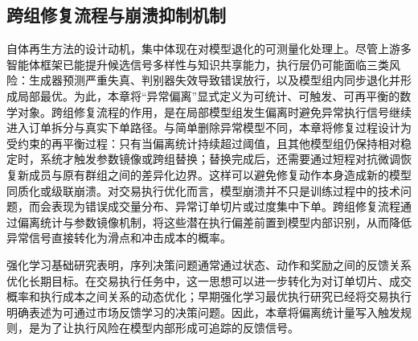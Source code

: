 \subsection{跨组修复流程与崩溃抑制机制}

自体再生方法的设计动机，集中体现在对模型退化的可测量化处理上。尽管上游多智能体框架已能提升候选信号多样性与知识共享能力，执行层仍可能面临三类风险：生成器预测严重失真、判别器失效导致错误放行，以及模型组内同步退化并形成局部最优。为此，本章将“异常偏离”显式定义为可统计、可触发、可再平衡的数学对象。跨组修复流程的作用，是在局部模型组发生偏离时避免异常执行信号继续进入订单拆分与真实下单路径。与简单删除异常模型不同，本章将修复过程设计为受约束的再平衡过程：只有当偏离统计持续超过阈值，且其他模型组仍保持相对稳定时，系统才触发参数镜像或跨组替换；替换完成后，还需要通过短程对抗微调恢复新成员与原有群组之间的差异化边界。这样可以避免修复动作本身造成新的模型同质化或级联崩溃。对交易执行优化而言，模型崩溃并不只是训练过程中的技术问题，而会表现为错误成交量分布、异常订单切片或过度集中下单。跨组修复流程通过偏离统计与参数镜像机制，将这些潜在执行偏差前置到模型内部识别，从而降低异常信号直接转化为滑点和冲击成本的概率。

强化学习基础研究表明，序列决策问题通常通过状态、动作和奖励之间的反馈关系优化长期目标\cite{Mnih2015HumanlevelCT}。在交易执行任务中，这一思想可以进一步转化为对订单切片、成交概率和执行成本之间关系的动态优化；早期强化学习最优执行研究已经将交易执行明确表述为可通过市场反馈学习的决策问题\cite{nevmyvaka2006reinforcement_acm}。因此，本章将偏离统计量写入触发规则，是为了让执行风险在模型内部形成可追踪的反馈信号。

